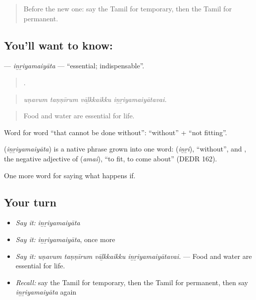 \label{lesson:TA-C553-inriyamaiyata}



\begin{quote}
Before the new one: say the Tamil for temporary, then the Tamil for permanent.
\end{quote}

\subsection*{You'll want to know: }
\textbf{} — \emph{iṉṟiyamaiyāta} — \textquotedblleft{}essential; indispensable\textquotedblright{}.

\begin{quote}
   .
\end{quote}

\begin{quote}
\emph{uṇavum taṇṇīrum vāḻkkaikku iṉṟiyamaiyātavai.}
\end{quote}

\begin{quote}
Food and water are essential for life.
\end{quote}

Word for word \textquotedblleft{}that cannot be done without\textquotedblright{}:  \textquotedblleft{}without\textquotedblright{} +  \textquotedblleft{}not fitting\textquotedblright{}.

\begin{cousinweb}
\textbf{} (\emph{iṉṟiyamaiyāta}) is a native phrase grown into one word:  (\emph{iṉṟi}), \textquotedblleft{}without\textquotedblright{}, and , the negative adjective of  (\emph{amai}), \textquotedblleft{}to fit, to come about\textquotedblright{} (DEDR 162).
\end{cousinweb}

\begin{grammarlens}[title={What you've built}]
One more word for saying what happens if.
\end{grammarlens}

\subsection*{Your turn}
\begin{itemize}
\raggedright
  \item \emph{Say it:} \emph{iṉṟiyamaiyāta}
  \item \emph{Say it:} \emph{iṉṟiyamaiyāta}, once more
  \item \emph{Say it:} \emph{uṇavum taṇṇīrum vāḻkkaikku iṉṟiyamaiyātavai.} — Food and water are essential for life.
  \item \emph{Recall:} say the Tamil for temporary, then the Tamil for permanent, then say \emph{iṉṟiyamaiyāta} again
\end{itemize}

